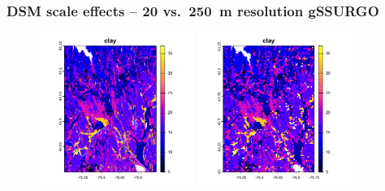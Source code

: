 \documentclass[aspectratio=169, 10pt]{beamer}
\begin{document}

\begin{frame}
  \frametitle{DSM scale effects -- 20 vs.\ 250~m resolution gSSURGO}
    \begin{figure}
    \centering
\includegraphics[width=0.45\textwidth]{./graphics_david/ClydeNY_gSSURGO_20.png}
\hfill
\includegraphics[width=0.45\textwidth]{./graphics_david/ClydeNY_gSSURGO_250.png}
\end{figure}  
\end{frame}

\end{document}
